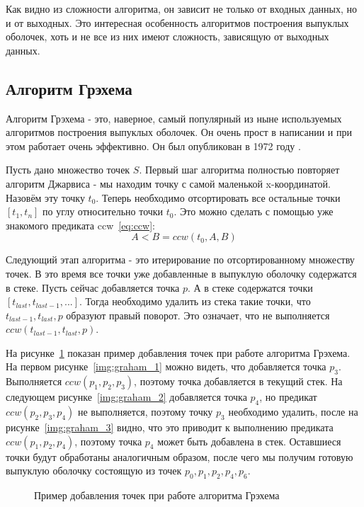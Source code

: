 Как видно из сложности алгоритма, он зависит не только от входных данных, но и от выходных. Это интересная особенность алгоритмов построения выпуклых оболочек, хоть и не все из них имеют сложность, зависящую от выходных данных.

\subsection{Алгоритм Грэхема} \label{subsect1_1_2}

Алгоритм Грэхема - это, наверное, самый популярный из ныне используемых алгоритмов построения выпуклых оболочек. Он очень прост в написании и при этом работает очень эффективно. Он был опубликован в 1972 году \cite{graham1972GrahamScan}.

Пусть дано множество точек $S$. Первый шаг алгоритма полностью повторяет алгоритм Джарвиса - мы находим точку с самой маленькой x-координатой. Назовём эту точку $t_0$. Теперь необходимо отсортировать все остальные точки $[t_1, t_n]$ по углу относительно точки $t_0$. Это можно сделать с помощью уже знакомого предиката ccw~\eqref{eq:ccw}:
\[
A<B=ccw(t_0, A, B)
\]

Следующий этап алгоритма - это итерирование по отсортированному множеству точек. В это время все точки уже добавленные в выпуклую оболочку содержатся в стеке. Пусть сейчас добавляется точка $p$. А в стеке содержатся точки $[t_{last}, t_{last-1}, ...]$. Тогда необходимо удалить из стека такие точки, что $t_{last-1}, t_{last}, p$ образуют правый поворот. Это означает, что не выполняется $ccw(t_{last-1}, t_{last}, p)$.

На рисунке~\ref{img:graham} показан пример добавления точек при работе алгоритма Грэхема. На первом рисунке~\ref{img:graham_1} можно видеть, что добавляется точка $p_3$. Выполняется $ccw(p_1, p_2, p_3)$, поэтому точка добавляется в текущий стек. На следующем рисунке~\ref{img:graham_2} добавляется точка $p_4$, но предикат $ccw(p_2, p_3, p_4)$ не выполняется, поэтому точку $p_3$ необходимо удалить, после на рисунке~\ref{img:graham_3} видно, что это приводит к выполнению предиката $ccw(p_1, p_2, p_4)$, поэтому точка $p_4$ может быть добавлена в стек. Оставшиеся точки будут обработаны аналогичным образом, после чего мы получим готовую выпуклую оболочку состоящую из точек $p_0, p_1, p_2, p_4, p_6$.

\begin{figure}[H]
	{\centering
		\hfill
		\subbottom[\label{img:graham_1}]{%
			}
		\hfill
		\subbottom[\label{img:graham_2}]{%
			}
		\hfill
		\subbottom[\label{img:graham_3}]{%
			}
		\hfill
	}
	\caption{Пример добавления точек при работе алгоритма Грэхема}
	\label{img:graham}
\end{figure}

